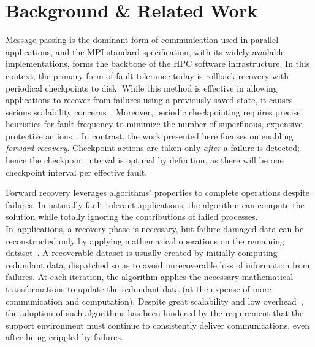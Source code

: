 \section{Background \& Related Work}
\label{sect:background}




Message passing is the dominant form of communication used in parallel
applications, and the MPI standard specification, with its widely 
available implementations, forms the backbone of the HPC software 
infrastructure.
In this context, the primary form of fault tolerance today is rollback recovery
with periodical checkpoints to disk. While this method is effective in allowing
applications to recover from failures using a previously saved state, it causes
serious scalability concerns~\cite{ExaScaleResilience09}. Moreover, periodic
checkpointing requires precise heuristics for fault frequency to minimize the
number of superfluous, expensive protective
actions~\cite{Young:1974,Gelenbe:1979,Plank01,Daly:2006,PreventiveCheckpointing11}.
In contrast, the work presented here focuses on enabling {\it forward
  recovery}. Checkpoint actions are taken only {\it after} a failure is
detected; hence the checkpoint interval is optimal by definition, as there will
be one checkpoint interval per effective fault.

Forward recovery leverages algorithms' properties to complete operations despite
failures. In naturally fault tolerant applications, the algorithm can compute
the solution while totally ignoring the contributions of failed
processes. In~\abft applications, a recovery phase is necessary, but failure
damaged data can be reconstructed only by applying mathematical operations on
the remaining dataset~\cite{huang1984algorithm}. A recoverable dataset is
usually created by initially computing redundant data, dispatched so as to avoid
unrecoverable loss of information from failures. At each iteration, the
algorithm applies the necessary mathematical transformations to update the
redundant data (at the expense of more communication and computation). Despite
great scalability and low overhead~\cite{luk1988analysis,pengduppopp12}, the
adoption of such algorithms has been hindered by the requirement that the
support environment must continue to consistently deliver communications, even
after being crippled by failures.

